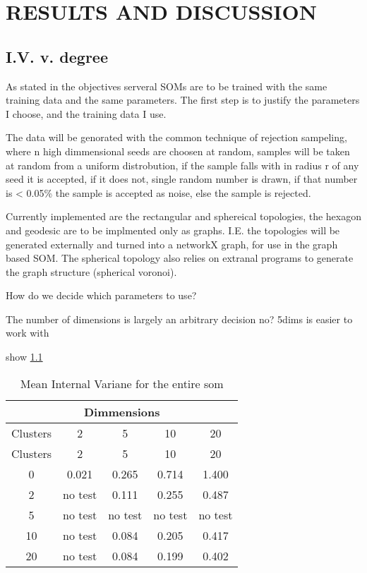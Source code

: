 \chapter{RESULTS AND DISCUSSION}



\section{I.V. v. degree}

As stated in the objectives serveral SOMs are to be trained with the same
training data and the same parameters.  The first step is to justify the
parameters I choose, and the training data I use.

The data will be genorated with the common technique of rejection sampeling,
where n high dimmensional seeds are choosen at random, samples will be taken
at random from a uniform distrobution, if the sample falls with in radius r of
any seed it is accepted, if it does not, single random number is drawn, if that
number is < 0.05\% the sample is accepted as noise, else the sample is rejected.

Currently implemented are the rectangular and sphereical topologies, the hexagon
and geodesic are to be implmented only as graphs.  I.E. the topologies will be
generated externally and turned into a networkX graph, for use in the graph
based SOM. The spherical topology also relies on extranal programs to generate
the graph structure (spherical voronoi).

How do we decide which parameters to use?

The number of dimensions is largely an arbitrary decision no?
5dims is easier to work with

show \ref{ivtable1}


\begin{table}
\caption{Mean Internal Variane for the entire som}
\label{ivtable1}
\begin{tabular}{|c|c|c|c|c|}
\hline
\multicolumn{5}{|c|}{Dimmensions}\\
\hline
Clusters & 2 & 5 & 10 & 20 \\
\hline
\hline
Clusters & 2 & 5 & 10 & 20\\
\hline
0 & 0.021& 0.265& 0.714& 1.400 \\
\hline
2 & no test& 0.111& 0.255& 0.487 \\
\hline
5 & no test& no test& no test& no test \\
\hline
10 & no test& 0.084& 0.205& 0.417 \\
\hline
20 & no test& 0.084& 0.199& 0.402 \\
\hline
\hline

\end{tabular}
\end{table}
